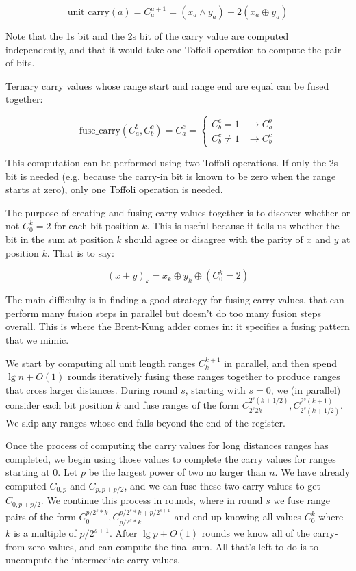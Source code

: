 \documentclass[onecolumn,unpublished]{quantumarticle}
\theoremstyle{definition}
\theoremstyle{definition}
\theoremstyle{definition}
\begin{document}
$$\text{unit\_carry}(a) = C_a^{a+1} = (x_a \land y_a) + 2 (x_a \oplus y_a)$$

Note that the 1s bit and the 2s bit of the carry value are computed independently, and that it would take one Toffoli operation to compute the pair of bits.

Ternary carry values whose range start and range end are equal can be fused together:

$$\text{fuse\_carry}(C_a^b, C_b^c) = C_a^c = \begin{cases}
C_b^c = 1 & \rightarrow C_a^b \\
C_b^c \neq 1 & \rightarrow C_b^c
\end{cases}$$

This computation can be performed using two Toffoli operations.
If only the 2s bit is needed (e.g. because the carry-in bit is known to be zero when the range starts at zero), only one Toffoli operation is needed.

The purpose of creating and fusing carry values together is to discover whether or not $C_0^k = 2$ for each bit position $k$.
This is useful because it tells us whether the bit in the sum at position $k$ should agree or disagree with the parity of $x$ and $y$ at position $k$.
That is to say:

$$(x + y)_k = x_k \oplus y_k \oplus (C_0^k = 2)$$

The main difficulty is in finding a good strategy for fusing carry values, that can perform many fusion steps in parallel but doesn't do too many fusion steps overall.
This is where the Brent-Kung adder comes in: it specifies a fusing pattern that we mimic.

We start by computing all unit length ranges $C_k^{k+1}$ in parallel, and then spend $\lg n + O(1)$ rounds iteratively fusing these ranges together to produce ranges that cross larger distances.
During round $s$, starting with $s=0$, we (in parallel) consider each bit position $k$ and fuse ranges of the form $C_{2^s 2k}^{2^s (k+1/2)}, C_{2^s (k+1/2) }^{2^s (k+1)}$.
We skip any ranges whose end falls beyond the end of the register.

Once the process of computing the carry values for long distances ranges has completed, we begin using those values to complete the carry values for ranges starting at 0.
Let $p$ be the largest power of two no larger than $n$.
We have already computed $C_{0,p}$ and $C_{p,p+p/2}$, and we can fuse these two carry values to get $C_{0,p+p/2}$.
We continue this process in rounds, where in round $s$ we fuse range pairs of the form $C_0^{p/2^s*k}, C_{p/2^s*k}^{p/2^s*k+p/2^{s+1}}$ and end up knowing all values $C_{0}^{k}$ where $k$ is a multiple of $p/2^{s+1}$.
After $\lg p + O(1)$ rounds we know all of the carry-from-zero values, and can compute the final sum.
All that's left to do is to uncompute the intermediate carry values.
\end{document}
